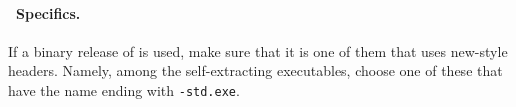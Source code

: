 \paragraph{\msvc\ Specifics.}

If a binary release of \leda{} is used, make sure that it is one of
them that uses new-style headers. Namely, among the self-extracting
executables, choose one of these that have the name ending with
\texttt{-std.exe}.









